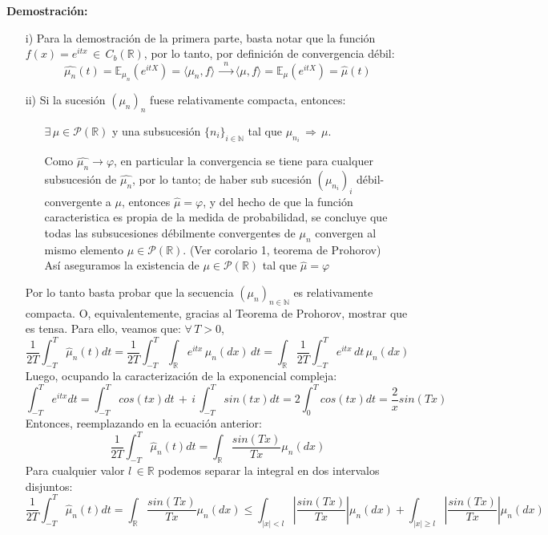 \documentclass[a4paper]{article}
\numberwithin{equation}{subsection}
\def\R{\mathbb R}
\def\N{\mathbb N}
\def\E{\mathbb E}
\begin{document}
\textbf{Demostración:} \begin{itemize}
    \item[i)] Para la demostración de la primera parte, basta notar que la función $f(x) = e^{itx}\,\in\,C_b(\R)$, por lo tanto, por definición de convergencia débil:
    \[\hat{\mu_n}(t) = \E_{\mu_n}(e^{itX}) = \langle \mu_n , f\rangle\,\xrightarrow{\,\,\,n\,\,\,}\langle \mu, f \rangle = \E_{\mu}(e^{itX}) = \hat{\mu}(t)\]
    
    \item[ii)] Si la sucesión $(\mu_n)_n$ fuese relativamente compacta, entonces:
    \begin{itemize}
        \item[\cdot] $\exists\,\mu\in\mathcal{P}(\R)$ y una subsucesión $\{n_i\}_{i \in \N}$ tal que $\mu_{n_i}\,\Rightarrow\,\mu$.
        \item[\cdot] Como $\hat{\mu_n}\rightarrow\varphi$, en particular la convergencia se tiene para cualquer subsucesión de $\hat{\mu_n}$, por lo tanto; de haber sub sucesión $(\mu_{n_i})_{i}$ débil-convergente a $\mu$, entonces $\hat{\mu} = \varphi$, y del hecho de que la función caracteristica es propia de la medida de probabilidad, se concluye que todas las subsucesiones débilmente convergentes de $\mu_n$ convergen al mismo elemento $\mu\in\mathcal{P}(\R)$. (Ver corolario 1, teorema de Prohorov)\\ \newline
        Así aseguramos la existencia de $\mu \in \mathcal{P}(\R)$ tal que $\hat{\mu} = \varphi$ 
    \end{itemize}
    Por lo tanto basta probar que la secuencia $(\mu_n)_{n\in\N}$ es relativamente compacta. O, equivalentemente, gracias al Teorema de Prohorov, mostrar que es tensa. Para ello, veamos que: $\forall\,T>0$,
    \[\frac{1}{2T}\int_{-T}^{T}\hat{\mu}_n(t)dt = \frac{1}{2T}\int_{-T}^{T}\int_{\R}e^{itx}\,\mu_n(dx)\,dt = \int_{\R}\frac{1}{2T}\int_{-T}^{T} e^{itx}\,dt\,\mu_n(dx) \]
    Luego, ocupando la caracterización de la exponencial compleja:
    \[\int_{-T}^{T}e^{itx}dt = \int_{-T}^{T}cos(tx)dt\,+\,i\,\int_{-T}^T sin(tx)dt = 2\int_{0}^{T}cos(tx)dt = \frac{2}{x}sin(Tx)\]
    Entonces, reemplazando en la ecuación anterior:
    \[\frac{1}{2T}\int_{-T}^{T}\hat{\mu}_n(t)dt = \int_{\R}\frac{sin(Tx)}{Tx}\mu_n(dx)\]
    Para cualquier valor $l\,\in\R$ podemos separar la integral en dos intervalos disjuntos:
    \[\frac{1}{2T}\int_{-T}^{T}\hat{\mu}_n(t)dt = \int_{\R}\frac{sin(Tx)}{Tx}\mu_n(dx) \leq \int_{|x|<l}\left|\frac{sin(Tx)}{Tx}\right| \mu_n(dx) + \int_{|x|\geq l}\left|\frac{sin(Tx)}{Tx}\right|\mu_n(dx)\]

\end{itemize}
\end{document}
